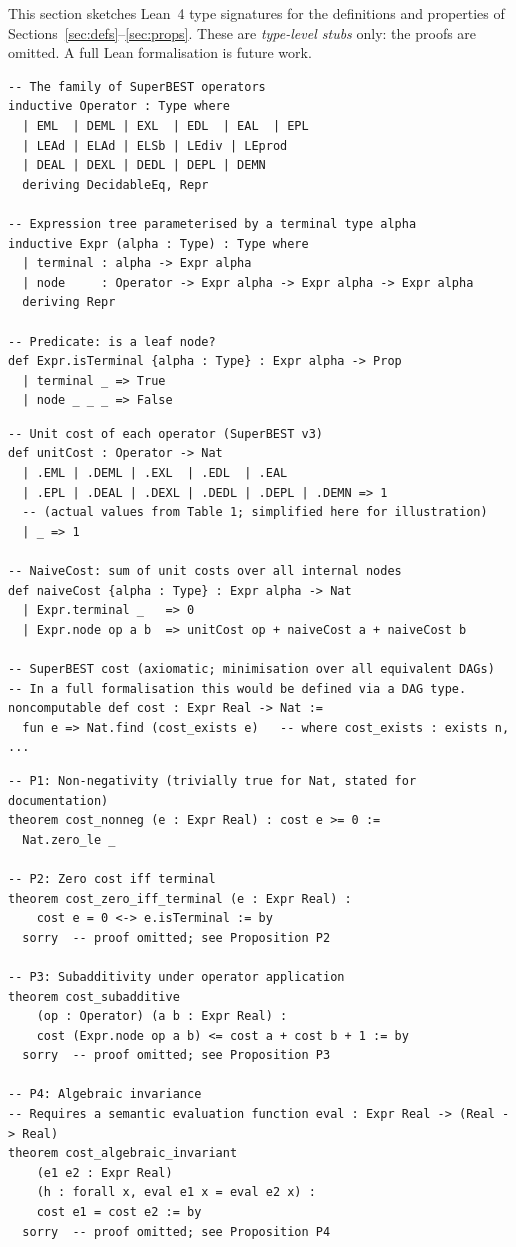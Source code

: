 \documentclass[12pt,a4paper]{article}
\theoremstyle{definition}
\begin{document}
This section sketches Lean~4 type signatures for the definitions and properties
of Sections~\ref{sec:defs}--\ref{sec:props}.  These are \emph{type-level stubs}
only: the proofs are omitted.  A full Lean formalisation is future work.

\begin{lstlisting}[style=lean, caption={Expression tree and operator types.}]
-- The family of SuperBEST operators
inductive Operator : Type where
  | EML  | DEML | EXL  | EDL  | EAL  | EPL
  | LEAd | ELAd | ELSb | LEdiv | LEprod
  | DEAL | DEXL | DEDL | DEPL | DEMN
  deriving DecidableEq, Repr

-- Expression tree parameterised by a terminal type alpha
inductive Expr (alpha : Type) : Type where
  | terminal : alpha -> Expr alpha
  | node     : Operator -> Expr alpha -> Expr alpha -> Expr alpha
  deriving Repr

-- Predicate: is a leaf node?
def Expr.isTerminal {alpha : Type} : Expr alpha -> Prop
  | terminal _ => True
  | node _ _ _ => False
\end{lstlisting}

\begin{lstlisting}[style=lean, caption={Cost function and NaiveCost.}]
-- Unit cost of each operator (SuperBEST v3)
def unitCost : Operator -> Nat
  | .EML | .DEML | .EXL  | .EDL  | .EAL
  | .EPL | .DEAL | .DEXL | .DEDL | .DEPL | .DEMN => 1
  -- (actual values from Table 1; simplified here for illustration)
  | _ => 1

-- NaiveCost: sum of unit costs over all internal nodes
def naiveCost {alpha : Type} : Expr alpha -> Nat
  | Expr.terminal _   => 0
  | Expr.node op a b  => unitCost op + naiveCost a + naiveCost b

-- SuperBEST cost (axiomatic; minimisation over all equivalent DAGs)
-- In a full formalisation this would be defined via a DAG type.
noncomputable def cost : Expr Real -> Nat :=
  fun e => Nat.find (cost_exists e)   -- where cost_exists : exists n, ...
\end{lstlisting}

\begin{lstlisting}[style=lean, caption={Type signatures for the four basic properties.}]
-- P1: Non-negativity (trivially true for Nat, stated for documentation)
theorem cost_nonneg (e : Expr Real) : cost e >= 0 :=
  Nat.zero_le _

-- P2: Zero cost iff terminal
theorem cost_zero_iff_terminal (e : Expr Real) :
    cost e = 0 <-> e.isTerminal := by
  sorry  -- proof omitted; see Proposition P2

-- P3: Subadditivity under operator application
theorem cost_subadditive
    (op : Operator) (a b : Expr Real) :
    cost (Expr.node op a b) <= cost a + cost b + 1 := by
  sorry  -- proof omitted; see Proposition P3

-- P4: Algebraic invariance
-- Requires a semantic evaluation function eval : Expr Real -> (Real -> Real)
theorem cost_algebraic_invariant
    (e1 e2 : Expr Real)
    (h : forall x, eval e1 x = eval e2 x) :
    cost e1 = cost e2 := by
  sorry  -- proof omitted; see Proposition P4
\end{lstlisting}
\end{document}
